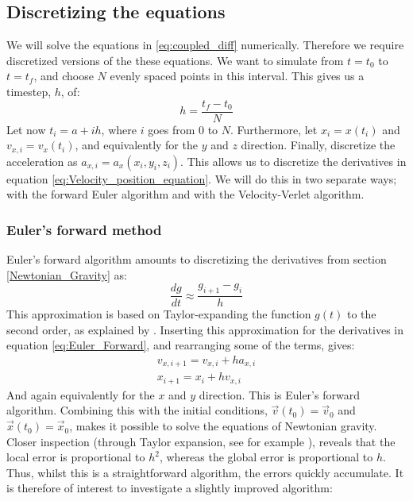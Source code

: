\documentclass[a4paper, 10pt]{article}
\begin{document}
\subsection{Discretizing the equations}\label{discretize_equations}
We will solve the equations in \ref{eq:coupled_diff} numerically. Therefore we require discretized versions of the these equations. We want to simulate from $t=t_0$ to $t=t_f$, and choose $N$ evenly spaced points in this interval. This gives us a timestep, $h$, of:
$$h=\frac{t_f-t_0}{N}$$
Let now $t_i=a+ih$, where $i$ goes from $0$ to $N$. Furthermore, let $x_i=x(t_i)$ and $ v_{x,i}=v_x(t_i)$, and equivalently for the $y$ and $z$ direction. Finally, discretize the acceleration as $a_{x,i}=a_x(x_i, y_i, z_i)$. This allows us to discretize the derivatives in equation \ref{eq:Velocity_position_equation}. We will do this in two separate ways; with the forward Euler algorithm and with the Velocity-Verlet algorithm.
\subsubsection{Euler's forward method}
Euler's forward algorithm amounts to discretizing the derivatives from section \ref{Newtonian_Gravity} as:
\begin{equation}\label{eq:Euler_Forward}
\frac{dg}{dt}\approx \frac{g_{i+1}-g_i}{h}
\end{equation}
This approximation is based on Taylor-expanding the function $g(t)$ to the second order, as explained by \cite{Forward_Euler}. Inserting this approximation for the derivatives in equation \ref{eq:Euler_Forward}, and rearranging some of the terms, gives:
\begin{equation}
\begin{split}
v_{x, i+1}=v_{x,i}+ha_{x,i}\\
x_{i+1}=x_i+hv_{x,i}
\end{split}
\end{equation}
And again equivalently for the $x$ and $y$ direction. This is Euler's forward algorithm. Combining this with the initial conditions, $\vec{v}(t_0)=\vec{v}_0$ and $\vec{x}(t_0)=\vec{x}_0$, makes it possible to solve the equations of Newtonian gravity. Closer inspection (through Taylor expansion, see for example \cite{Error_Euler}), reveals that the local error is proportional to $h^2$, whereas the global error is proportional to $h$. Thus, whilst this is a straightforward algorithm, the errors quickly accumulate. It is therefore of interest to investigate a slightly improved algorithm:
\end{document}
